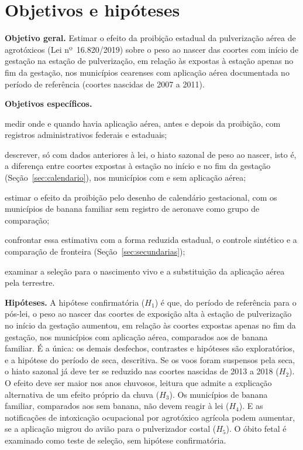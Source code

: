 
\chapter{Objetivos e hipóteses}
\label{cap:objetivos}

\textbf{Objetivo geral.} Estimar o efeito da proibição estadual da
pulverização aérea de agrotóxicos (Lei nº~16.820/2019) sobre o peso ao nascer
das coortes com início de gestação na estação de pulverização, em relação às
expostas à estação apenas no fim da gestação, nos municípios cearenses com
aplicação aérea documentada no período de referência (coortes nascidas de 2007
a 2011).

\textbf{Objetivos específicos.}
\begin{alineas}
  \item medir onde e quando havia aplicação aérea, antes e depois da
    proibição, com registros administrativos federais e estaduais;
  \item descrever, só com dados anteriores à lei, o hiato sazonal de peso ao
    nascer, isto é, a diferença entre coortes expostas à estação no início e
    no fim da gestação (Seção~\ref{sec:calendario}), nos municípios com e sem
    aplicação aérea;
  \item estimar o efeito da proibição pelo desenho de calendário gestacional,
    com os municípios de banana familiar sem registro de aeronave como grupo
    de comparação;
  \item confrontar essa estimativa com a forma reduzida estadual, o controle
    sintético e a comparação de fronteira (Seção~\ref{sec:secundarias});
  \item examinar a seleção para o nascimento vivo e a substituição da
    aplicação aérea pela terrestre.
\end{alineas}

\textbf{Hipóteses.} A hipótese confirmatória ($H_1$) é que, do período de
referência para o pós-lei, o peso ao nascer das coortes de exposição alta à
estação de pulverização no início da gestação aumentou, em relação às coortes
expostas apenas no fim da gestação, nos municípios com aplicação aérea,
comparados aos de banana familiar. É a única: os demais desfechos, contrastes e
hipóteses são exploratórios, e a hipótese do período de seca, descritiva. Se os voos
foram suspensos pela seca, o hiato sazonal já deve ter se reduzido nas coortes
nascidas de 2013 a 2018 ($H_2$). O efeito deve ser maior nos
anos chuvosos, leitura que admite a explicação alternativa de um efeito
próprio da chuva ($H_3$). Os municípios de banana familiar, comparados aos sem
banana, não devem reagir à lei ($H_4$). E as notificações de intoxicação
ocupacional por agrotóxico agrícola podem aumentar, se a aplicação migrou do
avião para o pulverizador costal ($H_5$). O óbito fetal é examinado como teste
de seleção, sem hipótese confirmatória.
